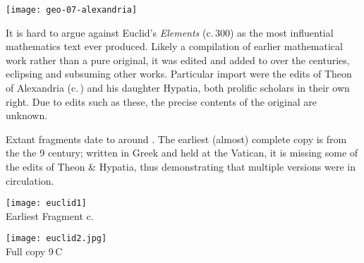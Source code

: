 \begin{center}
	\texttt{[image: geo-07-alexandria]}
\end{center}

It is hard to argue against Euclid's \emph{Elements} (c.\,300\BC{}) as the most influential mathematics text ever produced. Likely a compilation of earlier mathematical work rather than a pure original, it was edited and added to over the centuries, eclipsing and subsuming other works. Particular import were the edits of Theon of Alexandria (c.\,) and his daughter Hypatia, both prolific scholars in their own right. Due to edits such as these, the precise contents of the original are unknown.\smallbreak

Extant fragments date to around . The earliest (almost) complete copy is from the the 9\th{} century; written in Greek and held at the Vatican, it is missing some of the edits of Theon \& Hypatia, thus demonstrating that multiple versions were in circulation.

\begin{center}
	\begin{minipage}[b]{0.45\linewidth}
		\centering\texttt{[image: euclid1]}\\
		Earliest Fragment c.\,
	\end{minipage}
	\begin{minipage}[b]{0.45\linewidth}
		\centering\texttt{[image: euclid2.jpg]}\\
		Full copy 9\th\,C
	\end{minipage}
\end{center}

\goodbreak

